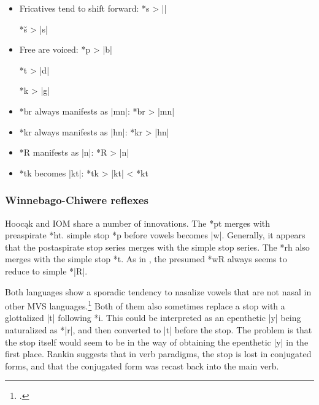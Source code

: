 \documentclass[output=paper]{LSP/langsci}
\begin{document}
 \begin{itemize}
 \item Fricatives tend to shift forward:  \hspace{.7em}   *s         >          ||

\hspace{13.6em}      *š         >          |s|

\item Free  are voiced:  \hspace{1.6em}   *p        >          |b|

\hspace{13.6em}      *t         >          |d|

\hspace{13.6em}       *k        >          |g|

\item *br always manifests as |mn|: \hspace{1.6em}    *br       >          |mn|

\item *kr always manifests as |hn|:  \hspace{1.7em}   *kr       >          |hn|

\item *R manifests as |n|:  \hspace{6em}     *R       >          |n|

 \item *tk becomes |kt|:  \hspace{7em}      *tk       >          |kt|       <          *kt
 \end{itemize}
 
\subsubsection{Winnebago-Chiwere reflexes}

Hooc\k{a}k and IOM share a number of innovations.  The  *pt merges with preaspirate *ht.   simple stop *p before vowels becomes |w|.  Generally, it appears that the postaspirate stop series merges with the simple stop series.  The *rh  also merges with the simple stop *t.  As in , the presumed  *wR always seems to reduce to simple *|R|.  

Both languages show a sporadic tendency to nasalize vowels that are not nasal in other MVS languages.\footnote{\citealt[50]{Rankinetal2006PDF}.} Both of them also sometimes replace a  stop with a glottalized |t\textsuperscript{}| following *i.  This could be interpreted as an epenthetic |y| being naturalized as *|r|, and then converted to |t| before the  stop.  The problem is that the  stop itself would seem to be in the way of obtaining the epenthetic |y| in the first place.  Rankin suggests that in verb paradigms, the  stop is lost in conjugated forms, and that the conjugated form was recast back into the main verb.
\end{document}
